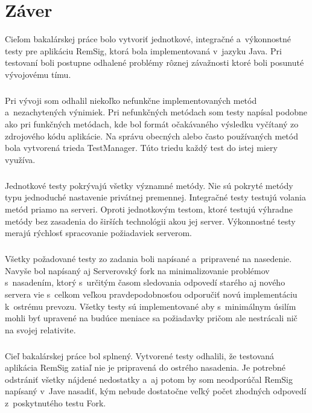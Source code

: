 \documentclass[
  digital, %
  table,   %
oneside,
  nolof,     %
  nolot,     %
]{fithesis3}
\begin{document}
\chapter{Záver}
Cieľom bakalárskej práce bolo vytvoriť jednotkové, integračné a~výkonnostné testy pre aplikáciu RemSig, ktorá bola implementovaná v~jazyku Java. Pri testovaní boli postupne odhalené problémy rôznej závažnosti ktoré boli posunuté vývojovému tímu. \paragraph{}
Pri vývoji som odhalil niekoľko nefunkčne implementovaných metód a~nezachytených výnimiek. Pri nefunkčných metódach som testy napísal podobne ako pri funkčných metódach, kde bol formát očakávaného výsledku vyčítaný zo zdrojového kódu aplikácie. Na správu obecných alebo často používaných metód bola vytvorená trieda TestManager. Túto triedu každý test do istej miery využíva. \paragraph{}
Jednotkové testy pokrývajú všetky významné metódy. Nie sú pokryté metódy typu jednoduché nastavenie privátnej premennej. Integračné testy testujú volania metód priamo na serveri. Oproti jednotkovým testom, ktoré testujú výhradne metódy bez zasadenia do širších technológii akou jej server. Výkonnostné testy merajú rýchlosť spracovanie požiadaviek serverom.\paragraph{}
Všetky požadované testy zo zadania boli napísané a~pripravené na nasedenie. Navyše bol napísaný aj Serverovský fork na minimalizovanie problémov s~nasadením, ktorý s~určitým časom sledovania odpovedí starého aj nového servera vie s~celkom veľkou pravdepodobnosťou odporučiť novú implementáciu k~ostrému prevozu. Všetky testy sú  implementované aby s~minimálnym úsilím mohli byť upravené na budúce meniace sa požiadavky pričom ale nestrácali nič na svojej relativite.\paragraph{}
Cieľ bakalárskej práce bol splnený. Vytvorené testy odhalili, že testovaná aplikácia RemSig zatiaľ nie je pripravená do ostrého nasadenia. Je potrebné odstrániť všetky nájdené nedostatky a~aj potom by som neodporúčal RemSig napísaný v~Jave nasadiť, kým nebude dostatočne veľký počet zhodných odpovedí z~poskytnutého testu Fork. 
\end{document}
